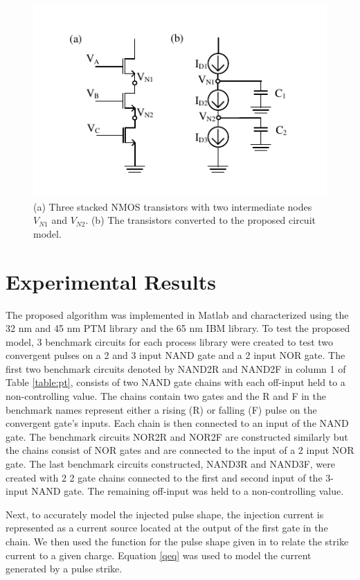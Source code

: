\begin{figure}[!htbp]
	\centering
	\includegraphics[width=0.70\linewidth]{Figures/Stacked}
	\caption{(a) Three stacked NMOS transistors with two intermediate nodes $V_{N1}$ and $V_{N2}$. (b) The transistors converted to the proposed circuit model.}
	\label{StackT}
\end{figure}

\section{Experimental Results}

The proposed algorithm was implemented in Matlab and characterized using the 32 nm and 45 nm PTM library \cite{PTM} and the 65 nm IBM library. To test the proposed model, 3 benchmark circuits for each process library were created to test two convergent pulses on a 2 and 3 input NAND gate and a 2 input NOR gate. The first two benchmark circuits denoted by NAND2R and NAND2F in column 1 of Table \ref{table:pt}, consists of two NAND gate chains with each off-input held to a non-controlling value. The chains contain two gates and the R and F in the benchmark names represent either a rising (R) or falling (F) pulse on the convergent gate’s inputs. Each chain is then connected to an input of the NAND gate. The benchmark circuits NOR2R and NOR2F are constructed similarly but the chains consist of NOR gates and are connected to the input of a 2 input NOR gate. The last benchmark circuits constructed, NAND3R and NAND3F, were created with 2 2 gate chains connected to the first and second input of the 3-input NAND gate. The remaining off-input was held to a non-controlling value. 

Next, to accurately model the injected pulse shape, the injection current is represented as a current source located at the output of the first gate in the chain. We then used the function for the pulse shape given in \cite{injeq} to relate the strike current to a given charge. Equation \ref{qeq} was used to model the current generated by a pulse strike.

